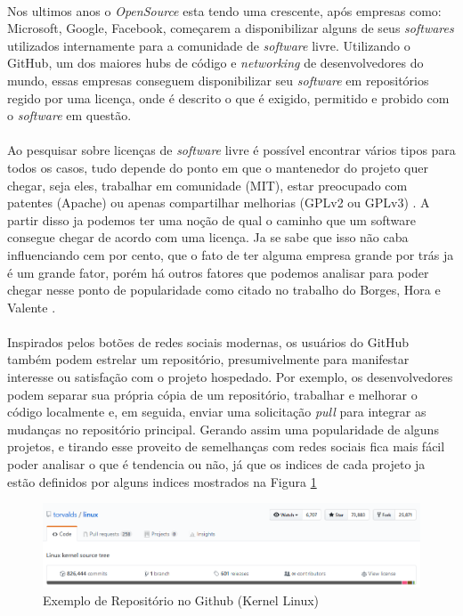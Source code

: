 \paragraph{}
Nos ultimos anos o \textit{OpenSource} esta tendo uma crescente, após empresas como: Microsoft, Google, Facebook, começarem a disponibilizar alguns de seus \textit{softwares} utilizados internamente para a comunidade de \textit{software} livre.
Utilizando o GitHub, um dos maiores hubs de código e \textit{networking} de desenvolvedores do mundo, essas empresas conseguem disponibilizar seu \textit{software} em repositórios regido por uma licença, onde é descrito o que é exigido, permitido e probido com o \textit{software} em questão.

\paragraph{}
Ao pesquisar sobre licenças de \textit{software} livre é possível encontrar vários tipos para todos os casos, tudo depende do ponto em que o mantenedor do projeto quer chegar, seja eles, trabalhar em comunidade (MIT), estar preocupado com patentes (Apache) ou apenas compartilhar melhorias (GPLv2 ou GPLv3) \cite{choosealicense}.
A partir disso ja podemos ter uma noção de qual o caminho que um software consegue chegar de acordo com uma licença. Ja se sabe que isso não caba influenciando cem por cento, que o fato de ter alguma empresa grande por trás ja é um grande fator, porém há outros fatores que podemos analisar para poder chegar nesse ponto de popularidade como citado no trabalho do Borges, Hora e Valente \cite{borges2016understanding}.

\paragraph{}
Inspirados pelos botões de redes sociais modernas, os usuários do GitHub também podem estrelar um repositório, presumivelmente para manifestar interesse ou satisfação com o projeto hospedado\cite{gousios2014exploratory, gousios2015work}.
Por exemplo, os desenvolvedores podem separar sua própria cópia de um repositório, trabalhar e melhorar o código localmente e, em seguida, enviar uma solicitação \textit{pull} para integrar as mudanças no repositório principal\cite{borges2016understanding}. Gerando assim uma popularidade de alguns projetos, e tirando esse proveito de semelhanças com redes sociais fica mais fácil poder analisar o que é tendencia ou não, já que os indices de cada projeto ja estão definidos por alguns indices mostrados na Figura \ref{fig:github-linux}
\begin{figure}[h!]
    \centering
    \includegraphics[width=\linewidth]{assets/images/github-linux.PNG}
    \caption{Exemplo de Repositório no Github (Kernel Linux)}
    \label{fig:github-linux}
\end{figure}

\paragraph{}
